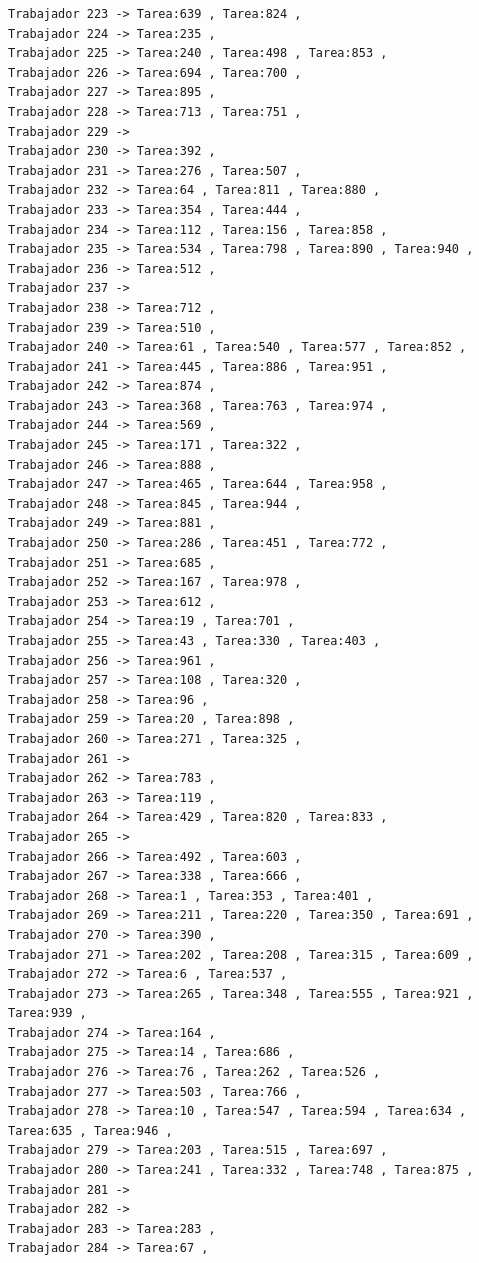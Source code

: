 \documentclass{article}
\begin{document}
\begin{lstlisting}
Trabajador 223 -> Tarea:639 , Tarea:824 , 
Trabajador 224 -> Tarea:235 , 
Trabajador 225 -> Tarea:240 , Tarea:498 , Tarea:853 , 
Trabajador 226 -> Tarea:694 , Tarea:700 , 
Trabajador 227 -> Tarea:895 , 
Trabajador 228 -> Tarea:713 , Tarea:751 , 
Trabajador 229 -> 
Trabajador 230 -> Tarea:392 , 
Trabajador 231 -> Tarea:276 , Tarea:507 , 
Trabajador 232 -> Tarea:64 , Tarea:811 , Tarea:880 , 
Trabajador 233 -> Tarea:354 , Tarea:444 , 
Trabajador 234 -> Tarea:112 , Tarea:156 , Tarea:858 , 
Trabajador 235 -> Tarea:534 , Tarea:798 , Tarea:890 , Tarea:940 , 
Trabajador 236 -> Tarea:512 , 
Trabajador 237 -> 
Trabajador 238 -> Tarea:712 , 
Trabajador 239 -> Tarea:510 , 
Trabajador 240 -> Tarea:61 , Tarea:540 , Tarea:577 , Tarea:852 , 
Trabajador 241 -> Tarea:445 , Tarea:886 , Tarea:951 , 
Trabajador 242 -> Tarea:874 , 
Trabajador 243 -> Tarea:368 , Tarea:763 , Tarea:974 , 
Trabajador 244 -> Tarea:569 , 
Trabajador 245 -> Tarea:171 , Tarea:322 , 
Trabajador 246 -> Tarea:888 , 
Trabajador 247 -> Tarea:465 , Tarea:644 , Tarea:958 , 
Trabajador 248 -> Tarea:845 , Tarea:944 , 
Trabajador 249 -> Tarea:881 , 
Trabajador 250 -> Tarea:286 , Tarea:451 , Tarea:772 , 
Trabajador 251 -> Tarea:685 , 
Trabajador 252 -> Tarea:167 , Tarea:978 , 
Trabajador 253 -> Tarea:612 , 
Trabajador 254 -> Tarea:19 , Tarea:701 , 
Trabajador 255 -> Tarea:43 , Tarea:330 , Tarea:403 , 
Trabajador 256 -> Tarea:961 , 
Trabajador 257 -> Tarea:108 , Tarea:320 , 
Trabajador 258 -> Tarea:96 , 
Trabajador 259 -> Tarea:20 , Tarea:898 , 
Trabajador 260 -> Tarea:271 , Tarea:325 , 
Trabajador 261 -> 
Trabajador 262 -> Tarea:783 , 
Trabajador 263 -> Tarea:119 , 
Trabajador 264 -> Tarea:429 , Tarea:820 , Tarea:833 , 
Trabajador 265 -> 
Trabajador 266 -> Tarea:492 , Tarea:603 , 
Trabajador 267 -> Tarea:338 , Tarea:666 , 
Trabajador 268 -> Tarea:1 , Tarea:353 , Tarea:401 , 
Trabajador 269 -> Tarea:211 , Tarea:220 , Tarea:350 , Tarea:691 , 
Trabajador 270 -> Tarea:390 , 
Trabajador 271 -> Tarea:202 , Tarea:208 , Tarea:315 , Tarea:609 , 
Trabajador 272 -> Tarea:6 , Tarea:537 , 
Trabajador 273 -> Tarea:265 , Tarea:348 , Tarea:555 , Tarea:921 , Tarea:939 , 
Trabajador 274 -> Tarea:164 , 
Trabajador 275 -> Tarea:14 , Tarea:686 , 
Trabajador 276 -> Tarea:76 , Tarea:262 , Tarea:526 , 
Trabajador 277 -> Tarea:503 , Tarea:766 , 
Trabajador 278 -> Tarea:10 , Tarea:547 , Tarea:594 , Tarea:634 , Tarea:635 , Tarea:946 , 
Trabajador 279 -> Tarea:203 , Tarea:515 , Tarea:697 , 
Trabajador 280 -> Tarea:241 , Tarea:332 , Tarea:748 , Tarea:875 , 
Trabajador 281 -> 
Trabajador 282 -> 
Trabajador 283 -> Tarea:283 , 
Trabajador 284 -> Tarea:67 , 

\end{lstlisting}
\end{document}
